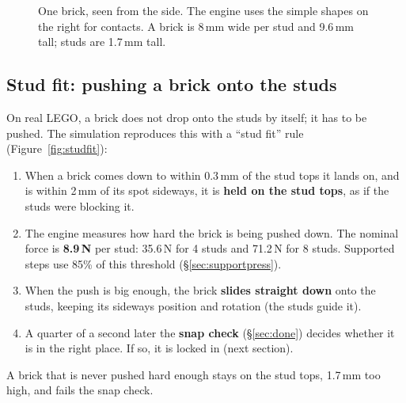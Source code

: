 \documentclass[11pt,a4paper]{article}
\newcommand{\brick}[3]{%
  \fill[#3] (#1,#2) rectangle ++(3.2,0.96); \draw (#1,#2) rectangle ++(3.2,0.96);
  \foreach \sx in {0.4,1.2,2.0,2.8} {\fill[#3] (#1+\sx-0.22,#2+0.96) rectangle ++(0.44,0.17); \draw (#1+\sx-0.22,#2+0.96) rectangle ++(0.44,0.17);}}
\begin{document}
\begin{figure}[H]
\centering
{}
\caption{One brick, seen from the side. The engine uses the simple shapes on the
right for contacts. A brick is 8\,mm wide per stud and 9.6\,mm tall; studs are
1.7\,mm tall.}
\label{fig:brickmodel}
\end{figure}

\subsection{Stud fit: pushing a brick onto the studs}\label{sec:studfit}

On real LEGO, a brick does not drop onto the studs by itself; it has to be
pushed. The simulation reproduces this with a ``stud fit'' rule
(Figure~\ref{fig:studfit}):

\begin{enumerate}
\item When a brick comes down to within 0.3\,mm of the stud tops it lands on, and is
      within 2\,mm of its spot sideways, it is \textbf{held on the stud tops}, as if the
      studs were blocking it.
\item The engine measures how hard the brick is being pushed down. The nominal
      force is \textbf{8.9\,N} per stud: 35.6\,N for 4 studs and 71.2\,N for
      8 studs. Supported steps use 85\% of this threshold (\S\ref{sec:supportpress}).
\item When the push is big enough, the brick \textbf{slides straight down} onto the
      studs, keeping its sideways position and rotation (the studs guide it).
\item A quarter of a second later the \textbf{snap check} (\S\ref{sec:done}) decides whether
      it is in the right place. If so, it is locked in (next section).
\end{enumerate}
A brick that is never pushed hard enough stays on the stud tops, 1.7\,mm too
high, and fails the snap check.
\end{document}
